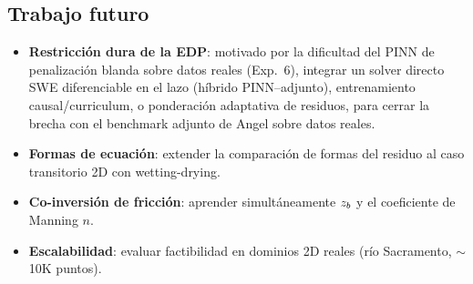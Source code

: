 \subsection{Trabajo futuro}

\begin{itemize}
  \item \textbf{Restricción dura de la EDP}: motivado por la dificultad del
        PINN de penalización blanda sobre datos reales (Exp.\ 6), integrar un
        solver directo SWE diferenciable en el lazo (híbrido PINN--adjunto),
        entrenamiento causal/curriculum, o ponderación adaptativa de residuos,
        para cerrar la brecha con el benchmark adjunto de Angel sobre datos
        reales.
  \item \textbf{Formas de ecuación}: extender la comparación de formas del
        residuo al caso transitorio 2D con wetting-drying.
  \item \textbf{Co-inversión de fricción}: aprender simultáneamente $z_b$
        y el coeficiente de Manning $n$.
  \item \textbf{Escalabilidad}: evaluar factibilidad en dominios 2D reales
        (río Sacramento, $\sim$10K puntos).
\end{itemize}
